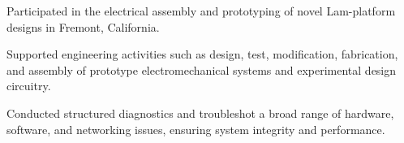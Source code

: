 \begin{tightemize}
    \item Participated in the electrical assembly and prototyping of novel Lam-platform designs in Fremont, California.
    
    \item Supported engineering activities such as design, test, modification, fabrication, and assembly of prototype electromechanical systems and experimental design circuitry.
     
    \item Conducted structured diagnostics and troubleshot a broad range of hardware, software, and networking issues, ensuring system integrity and performance.
\end{tightemize}